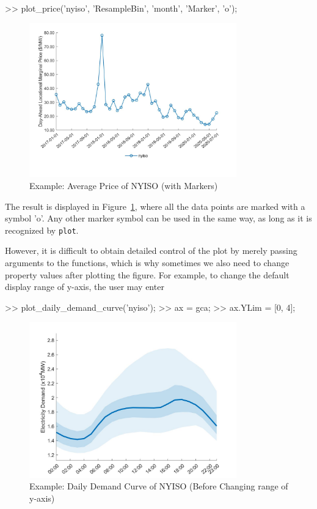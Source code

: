 \documentclass[11pt]{article}
\numberwithin{equation}{section}
\numberwithin{table}{section}
\numberwithin{figure}{section}
\begin{document}
\begin{Code}
  >> plot_price('nyiso', 'ResampleBin', 'month', 'Marker', 'o');
\end{Code}

\begin{figure}
  \centering
  \noindent\includegraphics[width=0.8\textwidth]{figures/visualization_example5.jpg}
  \caption{Example: Average Price of NYISO (with Markers)} \label{fig:vis_eg5}
\end{figure}

The result is displayed in Figure~\ref{fig:vis_eg5}, where all the data points are marked with a symbol 'o'. Any other marker symbol can be used in the same way, as long as it is recognized by \verb!plot!.

However, it is difficult to obtain detailed control of the plot by merely passing arguments to the functions, which is why sometimes we also need to change property values after plotting the figure. For example, to change the default display range of y-axis, the user may enter

\begin{Code}
  >> plot_daily_demand_curve('nyiso');
  >> ax = gca;
  >> ax.YLim = [0, 4];
\end{Code}

\begin{figure}
  \centering
  \noindent\includegraphics[width=0.8\textwidth]{figures/visualization_example6_1.jpg}
  \caption{Example: Daily Demand Curve of NYISO (Before Changing range of y-axis)} \label{fig:vis_eg6_1}
\end{figure}
\end{document}
